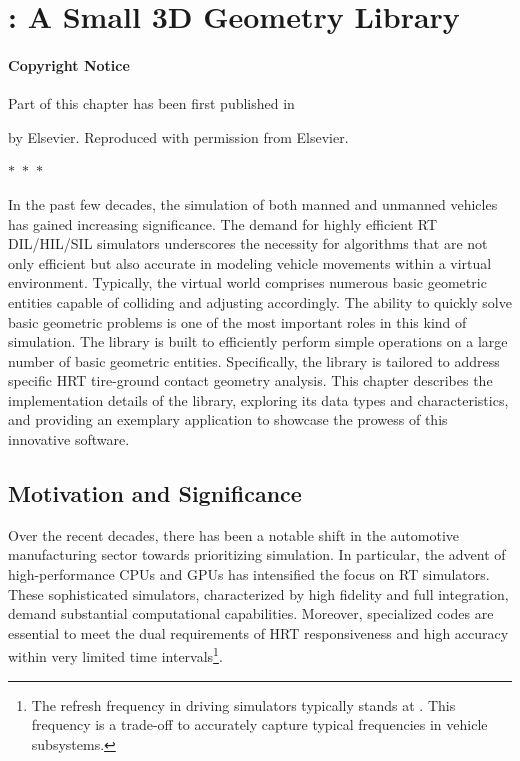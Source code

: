 
\chapter{\Acme{}: A Small 3D Geometry Library}
\label{app1:acme}

\subsubsection*{Copyright Notice}
Part of this chapter has been first published in
%
\begin{center}
  \begin{minipage}{0.9\textwidth}
  \end{minipage}
\end{center}
%
by Elsevier. Reproduced with permission from Elsevier.

\begin{center}
  $\ast$~$\ast$~$\ast$
\end{center}

In the past few decades, the simulation of both manned and unmanned vehicles has gained increasing significance. The demand for highly efficient \ac{RT} \ac{DIL}/\ac{HIL}/\ac{SIL} simulators underscores the necessity for algorithms that are not only efficient but also accurate in modeling vehicle movements within a virtual environment. Typically, the virtual world comprises numerous basic geometric entities capable of colliding and adjusting accordingly. The ability to quickly solve basic geometric problems is one of the most important roles in this kind of simulation. The \Acme{} library is built to efficiently perform simple operations on a large number of basic geometric entities. Specifically, the library is tailored to address specific \ac{HRT} tire-ground contact geometry analysis. This chapter describes the implementation details of the \Acme{} library, exploring its data types and characteristics, and providing an exemplary application to showcase the prowess of this innovative software.


\section{Motivation and Significance}
\label{app1:acme_motivation}

Over the recent decades, there has been a notable shift in the automotive manufacturing sector towards prioritizing simulation. In particular, the advent of high-performance \acp{CPU} and \acp{GPU} has intensified the focus on \ac{RT} simulators. These sophisticated simulators, characterized by high fidelity and full integration, demand substantial computational capabilities. Moreover, specialized codes are essential to meet the dual requirements of \ac{HRT} responsiveness and high accuracy within very limited time intervals\footnote{The refresh frequency in driving simulators typically stands at . This frequency is a trade-off to accurately capture typical frequencies in vehicle subsystems.}.

